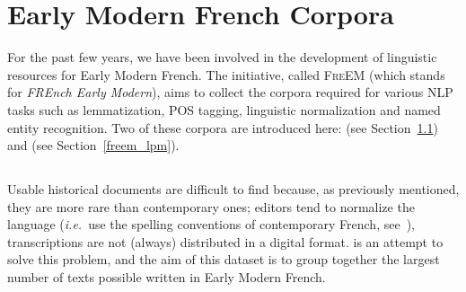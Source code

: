 \section{Early Modern French Corpora}

For the past few years, we have been involved in the development of linguistic resources for Early Modern French. The initiative, called \textsc{FreEM} (which stands for \emph{FREnch Early Modern}), aims to collect the corpora required for various NLP tasks such as lemmatization, POS tagging, linguistic normalization and named entity recognition. Two of these corpora are introduced here: \freemmax (see Section~\ref{freem_max}) and \freemlpm (see Section~\ref{freem_lpm}).

\subsection{\texorpdfstring{\freemmax}{FREEM max}}\label{freem_max}

Usable historical documents are difficult to find because, as previously mentioned, they are more rare than contemporary ones; editors tend to normalize the language (\emph{i.e.}~use the spelling conventions of contemporary French, see~\cite{gabay-2014-pourquoi}), transcriptions are not (always) distributed in a digital format. \freemmax \citep{gabay-etal-2022-FreEM} is an attempt to solve this problem, and the aim of this dataset is to group together the largest number of texts possible written in Early Modern French.

